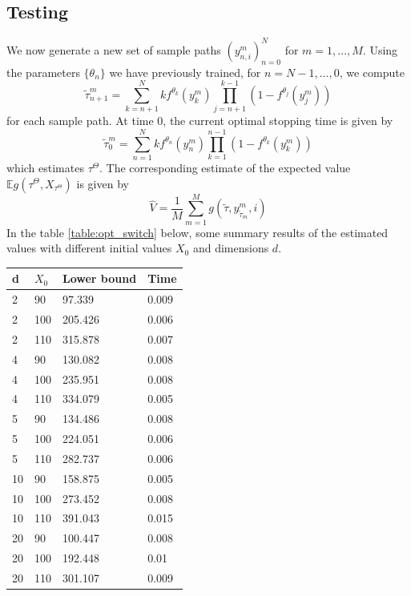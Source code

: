 \documentclass{article}
\begin{document}
\subsection{Testing}
We now generate a new set of sample paths $(y_{n,i}^m)_{n=0}^N$ for $m=1, \ldots, M$. Using the parameters $\{\theta_n\}$ we have previously trained, for $n=N-1, \ldots, 0$, we compute
\begin{equation}
    \tilde{\tau}_{n+1}^m = \sum_{k=n+1}^N k f^{\theta_k}(y_k^m) \prod_{j=n+1}^{k-1}(1-f^{\theta_j}(y_j^m))
\end{equation}
for each sample path. At time $0$, the current optimal stopping time is given by 
\begin{equation}
    \tilde{\tau}_{0}^m = \sum_{n=1}^N k f^{\theta_n}(y_n^m) \prod_{k=1}^{n-1}(1-f^{\theta_k}(y_k^m))
\end{equation}
which estimates $\tau^{\Theta}$. The corresponding estimate of the expected value $\mathbb{E}g(\tau^{\Theta}, X_{\tau^{\Theta}})$ is given by
\begin{equation}
    \hat{V}=\frac{1}{M}\sum_{m=1}^M g(\tilde{\tau}, y_{\tilde{\tau}_m}^m, i)
\end{equation}
In the table \ref{table:opt_switch} below, some summary results of the estimated values with different initial values $X_0$ and dimensions $d$.
\begin{center}
\begin{tabular}{ |l|l|l|l| }
\hline
d  & $X_0$ & Lower bound & Time  \\
\hline \hline
2  & 90   & 97.339      & 0.009 \\
2  & 100  & 205.426     & 0.006 \\
2  & 110  & 315.878     & 0.007 \\
\hline
4  & 90   & 130.082     & 0.008 \\
4  & 100  & 235.951     & 0.008 \\
4  & 110  & 334.079     & 0.005 \\
\hline
5  & 90   & 134.486     & 0.008 \\
5  & 100  & 224.051     & 0.006 \\
5  & 110  & 282.737     & 0.006 \\
\hline
10 & 90   & 158.875     & 0.005 \\
10 & 100  & 273.452     & 0.008 \\
10 & 110  & 391.043     & 0.015 \\
\hline
20 & 90   & 100.447     & 0.008 \\
20 & 100  & 192.448     & 0.01  \\
20 & 110  & 301.107     & 0.009 \\

\hline

\end{tabular}
\label{table:opt_switch}
\end{center}
\end{document}

